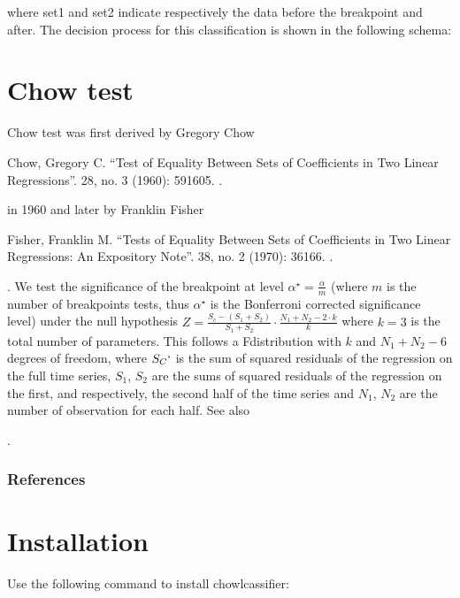 \documentclass[letterpaper,10pt,english]{sphinxmanual}
\begin{document}
\sphinxAtStartPar
where set1 and set2 indicate respectively the data before the breakpoint and after. The decision process for this classification is shown in the following schema:



\section{Chow test}
\label{\detokenize{index:chow-test}}
\sphinxAtStartPar
Chow test was first derived by Gregory Chow %
\begin{footnote}[1]\sphinxAtStartFootnote
Chow, Gregory C. “Test of Equality Between Sets of Coefficients in Two Linear Regressions”.  28, no. 3 (1960): 591\sphinxhyphen{}605. .
%
\end{footnote} in 1960 and later by Franklin Fisher %
\begin{footnote}[2]\sphinxAtStartFootnote
Fisher, Franklin M. “Tests of Equality Between Sets of Coefficients in Two Linear Regressions: An Expository Note”.  38, no. 2 (1970): 361\sphinxhyphen{}66. .
%
\end{footnote}. We test the significance of the breakpoint at level \(\alpha^\star = \frac{\alpha}{m}\) (where \(m\) is the number of breakpoints tests, thus \(\alpha^\star\) is the Bonferroni corrected significance level)  under the null hypothesis \(Z=\frac{S_c-(S_1+S_2)}{S_1+S_2}\cdot\frac{N_1+N_2-2\cdot k}{k}\) where \(k=3\) is the total number of parameters. This follows a F\sphinxhyphen{}distribution with \(k\) and \(N_1+N_2-6\) degrees of freedom, where \(S_C`\) is the sum of squared residuals of the regression on the full time series, \(S_1\), \(S_2\) are the sums of squared residuals of the regression on the first, and respectively, the second half of the time series and \(N_1\), \(N_2\) are the number of observation for each half. See also %
\begin{footnote}[3]\sphinxAtStartFootnote
{}
%
\end{footnote}.
\subsubsection*{References}


\section{Installation}
\label{\detokenize{index:installation}}
\sphinxAtStartPar
Use the following command to install chowlcassifier:
\end{document}
